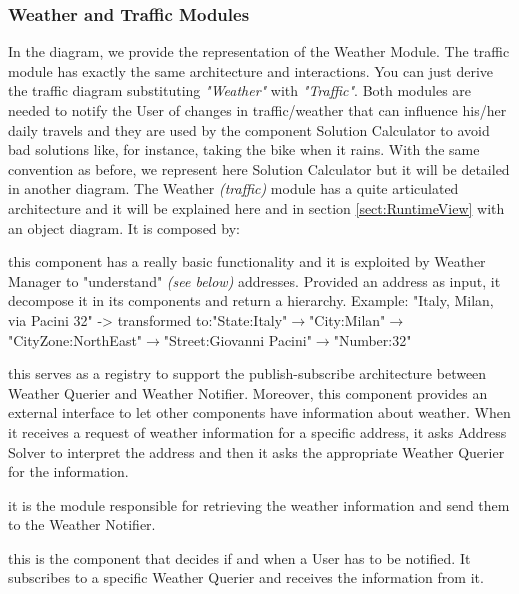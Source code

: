 	\filbreak
	\subsubsection{Weather and Traffic Modules}
		\label{sect:WeatherTrafficModules}
		In the diagram, we provide the representation of the Weather Module. The traffic module has exactly the same architecture and interactions. You can just derive the traffic diagram substituting \textit{"Weather"} with \textit{"Traffic"}. Both modules are needed to notify the User of changes in traffic/weather that can influence his/her daily travels and they are used by the component Solution Calculator to avoid bad solutions like, for instance, taking the bike when it rains. With the same convention as before, we represent here Solution Calculator but it will be detailed in another diagram.\newline
		The Weather \textit{(traffic)} module has a quite articulated architecture and it will be explained here and in section \ref{sect:RuntimeView} with an object diagram.\newline
		It is composed by:
		\begin{description}[before={\renewcommand{\makelabel}[1]{-- \textit{##1}:}}]
			\item[Address Solver] this component has a really basic functionality and it is exploited by Weather Manager to "understand" \textit{(see below)} addresses. Provided an address as input, it decompose it in its components and return a hierarchy.\newline
			Example: "Italy, Milan, via Pacini 32" -> transformed to:\newline "State:Italy"$\rightarrow$"City:Milan"$\rightarrow$"CityZone:NorthEast"$\rightarrow$"Street:Giovanni Pacini"$\rightarrow$"Number:32"
			\item[Weather Manager] this serves as a registry to support the publish-subscribe architecture between Weather Querier and Weather Notifier. Moreover, this component provides an external interface to let other components have information about weather. When it receives a request of weather information for a specific address, it asks Address Solver to interpret the address and then it asks the appropriate Weather Querier for the information.
			\item[Weather Querier] it is the module responsible for retrieving the weather information and send them to the Weather Notifier.
			\item[Weather Notifier] this is the component that decides if and when a User has to be notified. It subscribes to a specific Weather Querier and receives the information from it. 
		\end{description}
